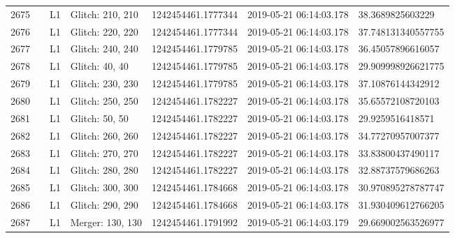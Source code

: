 \begin{longtable}{lllllll}
2675 &                                                    &       L1 &  Glitch: 210, 210 &  1242454461.1777344 &  2019-05-21 06:14:03.178 &    38.3689825603229 \\
2676 &                                                    &       L1 &  Glitch: 220, 220 &  1242454461.1777344 &  2019-05-21 06:14:03.178 &  37.748131340557755 \\
2677 &                                                    &       L1 &  Glitch: 240, 240 &  1242454461.1779785 &  2019-05-21 06:14:03.178 &   36.45057896616057 \\
2678 &                                                    &       L1 &    Glitch: 40, 40 &  1242454461.1779785 &  2019-05-21 06:14:03.178 &  29.909998926621775 \\
2679 &                                                    &       L1 &  Glitch: 230, 230 &  1242454461.1779785 &  2019-05-21 06:14:03.178 &   37.10876144342912 \\
2680 &                                                    &       L1 &  Glitch: 250, 250 &  1242454461.1782227 &  2019-05-21 06:14:03.178 &   35.65572108720103 \\
2681 &                                                    &       L1 &    Glitch: 50, 50 &  1242454461.1782227 &  2019-05-21 06:14:03.178 &    29.9259516418571 \\
2682 &                                                    &       L1 &  Glitch: 260, 260 &  1242454461.1782227 &  2019-05-21 06:14:03.178 &   34.77270957007377 \\
2683 &                                                    &       L1 &  Glitch: 270, 270 &  1242454461.1782227 &  2019-05-21 06:14:03.178 &   33.83800437490117 \\
2684 &                                                    &       L1 &  Glitch: 280, 280 &  1242454461.1782227 &  2019-05-21 06:14:03.178 &   32.88737579686263 \\
2685 &                                                    &       L1 &  Glitch: 300, 300 &  1242454461.1784668 &  2019-05-21 06:14:03.178 &  30.970895278787747 \\
2686 &                                                    &       L1 &  Glitch: 290, 290 &  1242454461.1784668 &  2019-05-21 06:14:03.178 &  31.930409612766205 \\
2687 &                                                    &       L1 &  Merger: 130, 130 &  1242454461.1791992 &  2019-05-21 06:14:03.179 &  29.669002563526977 \\

\end{longtable}
